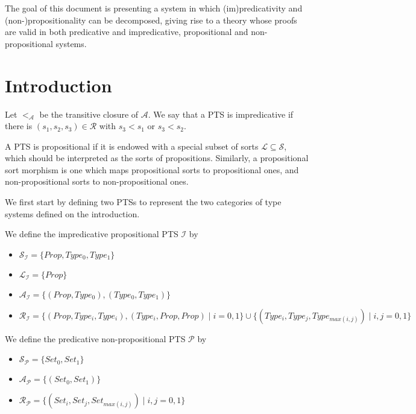 \documentclass[]{template}
\begin{document}
The goal of this document is presenting a system in which (im)predicativity and (non-)propositionality can be decomposed, giving rise to a theory whose proofs are valid in both predicative and impredicative, propositional and non-propositional systems. 

\section{Introduction}
\label{sec:label}



\begin{definition}[Impredicativity]
Let $ <_\mathcal{A} $ be the transitive closure of $ \mathcal{A} $. We say that a PTS is impredicative if there is $ (s_1,s_2,s_3) \in \mathcal{R} $ with $ s_3 < s_1 $ or $ s_3 < s_2 $.
\end{definition}

\begin{definition}[Propositionality]
A PTS is propositional if it is endowed with a special subset of sorts $ \mathcal{L} \subseteq \mathcal{S} $, which should be interpreted as the sorts of propositions. Similarly, a propositional sort morphism is one which maps propositional sorts to propositional ones, and non-propositional sorts to non-propositional ones.
\end{definition}

We first start by defining two PTSs to represent the two categories of type systems defined on the introduction.

\begin{definition}
  We define the impredicative propositional PTS $ \mathcal{I}$ by
  \begin{itemize}
  \item $ \mathcal{S}_\mathcal{I} = \{Prop, Type_0, Type_1\} $
  \item $ \mathcal{L}_\mathcal{I} = \{Prop\} $
  \item $ \mathcal{A}_\mathcal{I} = \{(Prop, Type_0), (Type_0,Type_1)\} $
  \item $ \mathcal{R}_\mathcal{I} = \{(Prop, Type_i, Type_i), (Type_i, Prop, Prop) \mid i =0,1\} \cup \{(Type_i, Type_j, Type_{max(i,j)}) \mid i,j = 0, 1\}$   
  \end{itemize}
\end{definition}

\begin{definition}
  We define the predicative non-propositional PTS $ \mathcal{P}$ by
  \begin{itemize}
  \item $ \mathcal{S}_\mathcal{P} = \{Set_0, Set_1\} $
  \item $ \mathcal{A}_\mathcal{P} = \{(Set_0, Set_1)\} $
  \item $ \mathcal{R}_\mathcal{P} = \{(Set_i, Set_j, Set_{max(i,j)}) \mid i,j = 0, 1\}$    
  \end{itemize}
\end{definition}
\end{document}
